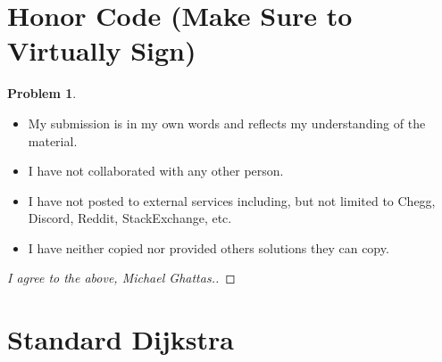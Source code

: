 \documentclass[11pt]{article}
\theoremstyle{definition}
\theoremstyle{definition}
\newtheorem{required}{Problem}
\theoremstyle{definition}
\begin{document}
\section{Honor Code (Make Sure to Virtually Sign)} \label{HonorCode}

\begin{required}
\noindent 
\begin{itemize}
\item My submission is in my own words and reflects my understanding of the material.
\item I have not collaborated with any other person.
\item I have not posted to external services including, but not limited to Chegg, Discord, Reddit, StackExchange, etc.
\item I have neither copied nor provided others solutions they can copy.
\end{itemize}

\end{required}

\begin{proof}[I agree to the above, Michael Ghattas.]
\end{proof}



\newpage
\section{Standard Dijkstra}
\end{document}
